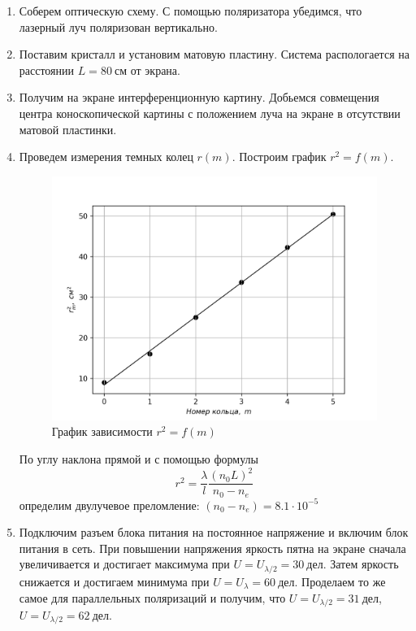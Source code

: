 \documentclass[14pt, a4paper]{report}
\begin{document}
\begin{enumerate}

\setcounter{enumi}{0}

\item Соберем оптическую схему. С помощью поляризатора убедимся, что лазерный луч поляризован вертикально.

\item Поставим кристалл и установим матовую пластину. Система распологается на расстоянии $L=80\ см$ от экрана.

\item Получим на экране интерференционную картину. Добьемся совмещения центра коноскопической картины с положением луча на экране в отсутствии матовой пластинки.

\item Проведем измерения темных колец $r(m)$. Построим график $r^2=f(m)$. 
\begin{figure}[H]
\centering
\includegraphics[scale=0.6]{images/472_2.png}
\caption{График зависимости $r^2=f(m)$}
\end{figure}

По углу наклона прямой и с помощью формулы
\[r^2=\frac{\lambda}{l}\frac{(n_0L)^2}{n_0-n_e}\]
определим двулучевое преломление: $(n_0-n_e)=8.1\cdot10^{-5}$

\item Подключим разъем блока питания на постоянное напряжение и включим блок питания в сеть. При повышении напряжения яркость пятна на экране сначала увеличивается и достигает максимума при $U=U_{\lambda/2}=30\ дел$. Затем яркость снижается и достигаем минимума при $U=U_{\lambda}=60\ дел$. Проделаем то же самое для параллельных поляризаций и получим, что $U=U_{\lambda/2}=31\ дел$, $U=U_{\lambda/2}=62\ дел$.

\end{enumerate}
\end{document}
